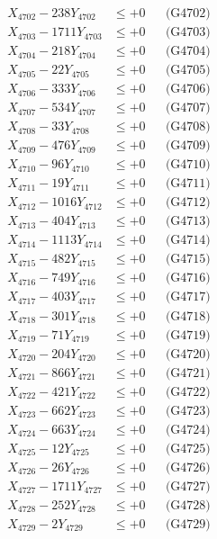 \documentclass[a4paper,10pt]{article}
\begin{document}
{\begin{align}
X_{4702} - 238Y_{4702} &\leq +0 && \text{(G4702)} \\
X_{4703} - 1711Y_{4703} &\leq +0 && \text{(G4703)} \\
X_{4704} - 218Y_{4704} &\leq +0 && \text{(G4704)} \\
X_{4705} - 22Y_{4705} &\leq +0 && \text{(G4705)} \\
X_{4706} - 333Y_{4706} &\leq +0 && \text{(G4706)} \\
X_{4707} - 534Y_{4707} &\leq +0 && \text{(G4707)} \\
X_{4708} - 33Y_{4708} &\leq +0 && \text{(G4708)} \\
X_{4709} - 476Y_{4709} &\leq +0 && \text{(G4709)} \\
X_{4710} - 96Y_{4710} &\leq +0 && \text{(G4710)} \\
\allowbreak
X_{4711} - 19Y_{4711} &\leq +0 && \text{(G4711)} \\
X_{4712} - 1016Y_{4712} &\leq +0 && \text{(G4712)} \\
X_{4713} - 404Y_{4713} &\leq +0 && \text{(G4713)} \\
X_{4714} - 1113Y_{4714} &\leq +0 && \text{(G4714)} \\
X_{4715} - 482Y_{4715} &\leq +0 && \text{(G4715)} \\
X_{4716} - 749Y_{4716} &\leq +0 && \text{(G4716)} \\
X_{4717} - 403Y_{4717} &\leq +0 && \text{(G4717)} \\
X_{4718} - 301Y_{4718} &\leq +0 && \text{(G4718)} \\
X_{4719} - 71Y_{4719} &\leq +0 && \text{(G4719)} \\
X_{4720} - 204Y_{4720} &\leq +0 && \text{(G4720)} \\
\allowbreak
X_{4721} - 866Y_{4721} &\leq +0 && \text{(G4721)} \\
X_{4722} - 421Y_{4722} &\leq +0 && \text{(G4722)} \\
X_{4723} - 662Y_{4723} &\leq +0 && \text{(G4723)} \\
X_{4724} - 663Y_{4724} &\leq +0 && \text{(G4724)} \\
X_{4725} - 12Y_{4725} &\leq +0 && \text{(G4725)} \\
X_{4726} - 26Y_{4726} &\leq +0 && \text{(G4726)} \\
X_{4727} - 1711Y_{4727} &\leq +0 && \text{(G4727)} \\
X_{4728} - 252Y_{4728} &\leq +0 && \text{(G4728)} \\
X_{4729} - 2Y_{4729} &\leq +0 && \text{(G4729)} \\

\end{align}}
\end{document}
